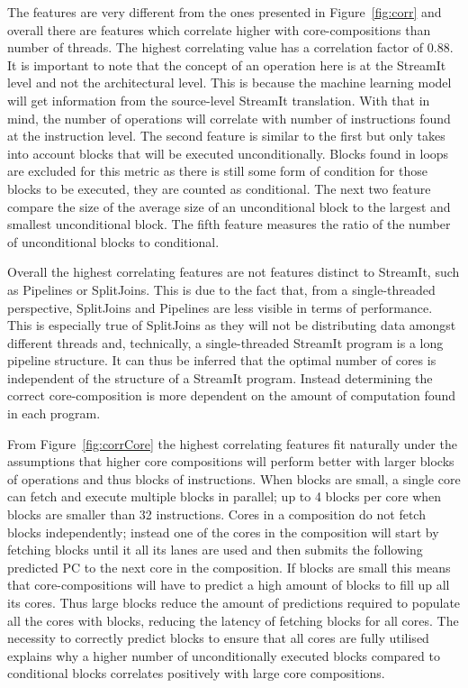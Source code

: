 The features are very different from the ones presented in Figure~\ref{fig:corr} and overall there are features which correlate higher with core-compositions than number of threads.
The highest correlating value has a correlation factor of 0.88.
It is important to note that the concept of an operation here is at the StreamIt level and not the architectural level.
This is because the machine learning model will get information from the source-level StreamIt translation.
With that in mind, the number of operations will correlate with number of instructions found at the instruction level.
The second feature is similar to the first but only takes into account blocks that will be executed unconditionally.
Blocks found in loops are excluded for this metric as there is still some form of condition for those blocks to be executed, they are counted as conditional.
The next two feature compare the size of the average size of an unconditional block to the largest and smallest unconditional block.
The fifth feature measures the ratio of the number of unconditional blocks to conditional.

Overall the highest correlating features are not features distinct to StreamIt, such as Pipelines or SplitJoins.
This is due to the fact that, from a single-threaded perspective, SplitJoins and Pipelines are less visible in terms of performance.
This is especially true of SplitJoins as they will not be distributing data amongst different threads and, technically, a single-threaded StreamIt program is a long pipeline structure.
It can thus be inferred that the optimal number of cores is independent of the structure of a StreamIt program.
Instead determining the correct core-composition is more dependent on the amount of computation found in each program.

From Figure~\ref{fig:corrCore} the highest correlating features fit naturally under the assumptions that higher core compositions will perform better with larger blocks of operations and thus blocks of instructions.
When blocks are small, a single core can fetch and execute multiple blocks in parallel; up to 4 blocks per core when blocks are smaller than 32 instructions.
Cores in a composition do not fetch blocks independently; instead one of the cores in the composition will start by fetching blocks until it all its lanes are used and then submits the following predicted PC to the next core in the composition.
If blocks are small this means that core-compositions will have to predict a high amount of blocks to fill up all its cores.
Thus large blocks reduce the amount of predictions required to populate all the cores with blocks, reducing the latency of fetching blocks for all cores.
The necessity to correctly predict blocks to ensure that all cores are fully utilised explains why a higher number of unconditionally executed blocks compared to conditional blocks correlates positively with large core compositions.

